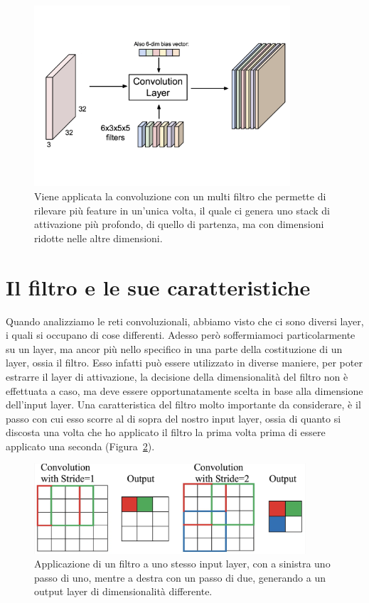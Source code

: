 \begin{figure}[htbp]
    \centering
    \includegraphics[width=0.85\textwidth]{figure/CNNConvolution2.png}
    \caption{Viene applicata la convoluzione con un multi filtro che permette di rilevare più feature in un'unica volta, il quale ci genera uno stack di attivazione più profondo, di quello di partenza, ma con dimensioni ridotte nelle altre dimensioni.}
    \label{fig:convolution_layer_multifilter}
\end{figure}

\section{Il filtro e le sue caratteristiche}

Quando analizziamo le reti convoluzionali, abbiamo visto che ci sono diversi layer, i quali si occupano di cose differenti. Adesso però soffermiamoci particolarmente su un layer, ma ancor più nello specifico in una parte della costituzione di un layer, ossia il filtro. Esso infatti può essere utilizzato in diverse maniere, per poter estrarre il layer di attivazione, la decisione della dimensionalità del filtro non è effettuata a caso, ma deve essere opportunatamente scelta in base alla dimensione dell'input layer. Una caratteristica del filtro molto importante da considerare, è il passo con cui esso scorre al di sopra del nostro input layer, ossia di quanto si discosta una volta che ho applicato il filtro la prima volta prima di essere applicato una seconda (Figura~\ref{fig:filter_stride}). 
\begin{figure}
    \centering
    \includegraphics[width=0.90\textwidth]{figure/Filtering_stride.png}
    \caption{Applicazione di un filtro a uno stesso input layer, con a sinistra uno passo di uno, mentre a destra con un passo di due, generando a un output layer di dimensionalità differente.}
    \label{fig:filter_stride}
\end{figure}


